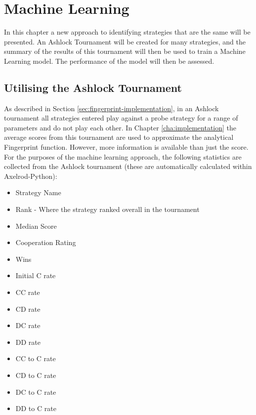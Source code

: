 
\chapter{Machine Learning}\label{cha:machinelearning}

In this chapter a new approach to identifying strategies that are the same will be presented.
An Ashlock Tournament will be created for many strategies, and the summary of the results of this tournament will then be used to train a Machine Learning model.
The performance of the model will then be assessed.



\section{Utilising the Ashlock Tournament}\label{sec:ashlock_tourn}

As described in Section \ref{sec:fingerprint-implementation}, in an Ashlock tournament all strategies entered play against a probe strategy for a range of parameters and do not play each other.
In Chapter \ref{cha:implementation} the average scores from this tournament are used to approximate the analytical Fingerprint function.
However, more information is available than just the score.
For the purposes of the machine learning approach, the following statistics are collected from the Ashlock tournament (these are automatically calculated within Axelrod-Python):

\begin{itemize}
    \item Strategy Name
    \item Rank - Where the strategy ranked overall in the tournament
    \item Median Score
    \item Cooperation Rating
    \item Wins
    \item Initial C rate
    \item CC rate
    \item CD rate
    \item DC rate
    \item DD rate
    \item CC to C rate
    \item CD to C rate
    \item DC to C rate
    \item DD to C rate
\end{itemize}

